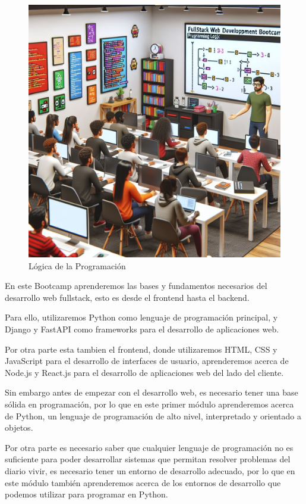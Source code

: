 \documentclass[
  a4paper,
  DIV=11,
  numbers=noendperiod,
  onepage,
  openany]{scrreprt}
\begin{document}
\begin{figure}[H]

{\centering \includegraphics{unidades/unidad1/images/logica_programacion.jpeg}

}

\caption{Lógica de la Programación}

\end{figure}%

En este Bootcamp aprenderemos las bases y fundamentos necesarios del
desarrollo web fullstack, esto es desde el frontend hasta el backend.

Para ello, utilizaremos Python como lenguaje de programación principal,
y Django y FastAPI como frameworks para el desarrollo de aplicaciones
web.

Por otra parte esta tambien el frontend, donde utilizaremos HTML, CSS y
JavaScript para el desarrollo de interfaces de usuario, aprenderemos
acerca de Node.js y React.js para el desarrollo de aplicaciones web del
lado del cliente.

Sin embargo antes de empezar con el desarrollo web, es necesario tener
una base sólida en programación, por lo que en este primer módulo
aprenderemos acerca de Python, un lenguaje de programación de alto
nivel, interpretado y orientado a objetos.

Por otra parte es necesario saber que cualquier lenguaje de programación
no es suficiente para poder desarrollar sistemas que permitan resolver
problemas del diario vivir, es necesario tener un entorno de desarrollo
adecuado, por lo que en este módulo también aprenderemos acerca de los
entornos de desarrollo que podemos utilizar para programar en Python.
\end{document}
